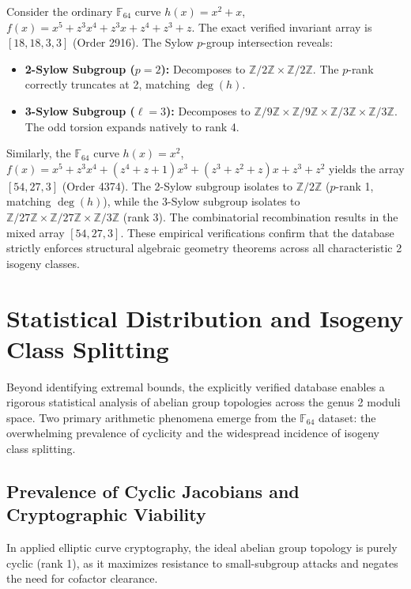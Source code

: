 \documentclass[letterpaper, 11pt]{article}
\begin{document}
Consider the ordinary $\mathbb{F}_{64}$ curve $h(x) = x^2 + x$, $f(x) = x^5 + z^3x^4 + z^3x + z^4 + z^3 + z$. The exact verified invariant array is $[18, 18, 3, 3]$ (Order 2916). The Sylow $p$-group intersection reveals:
\begin{itemize}
    \item \textbf{2-Sylow Subgroup ($p=2$):} Decomposes to $\mathbb{Z}/2\mathbb{Z} \times \mathbb{Z}/2\mathbb{Z}$. The $p$-rank correctly truncates at 2, matching $\deg(h)$.
    \item \textbf{3-Sylow Subgroup ($\ell = 3$):} Decomposes to $\mathbb{Z}/9\mathbb{Z} \times \mathbb{Z}/9\mathbb{Z} \times \mathbb{Z}/3\mathbb{Z} \times \mathbb{Z}/3\mathbb{Z}$. The odd torsion expands natively to rank 4.
\end{itemize}

Similarly, the $\mathbb{F}_{64}$ curve $h(x) = x^2$, $f(x) = x^5 + z^3x^4 + (z^4 + z + 1)x^3 + (z^3 + z^2 + z)x + z^3 + z^2$ yields the array $[54, 27, 3]$ (Order 4374). The 2-Sylow subgroup isolates to $\mathbb{Z}/2\mathbb{Z}$ ($p$-rank 1, matching $\deg(h)$), while the 3-Sylow subgroup isolates to $\mathbb{Z}/27\mathbb{Z} \times \mathbb{Z}/27\mathbb{Z} \times \mathbb{Z}/3\mathbb{Z}$ (rank 3). The combinatorial recombination results in the mixed array $[54, 27, 3]$. These empirical verifications confirm that the database strictly enforces structural algebraic geometry theorems across all characteristic 2 isogeny classes.

\section{Statistical Distribution and Isogeny Class Splitting}
Beyond identifying extremal bounds, the explicitly verified database enables a rigorous statistical analysis of abelian group topologies across the genus 2 moduli space. Two primary arithmetic phenomena emerge from the $\mathbb{F}_{64}$ dataset: the overwhelming prevalence of cyclicity and the widespread incidence of isogeny class splitting.

\subsection{Prevalence of Cyclic Jacobians and Cryptographic Viability}
In applied elliptic curve cryptography, the ideal abelian group topology is purely cyclic (rank 1), as it maximizes resistance to small-subgroup attacks and negates the need for cofactor clearance. 
\end{document}
